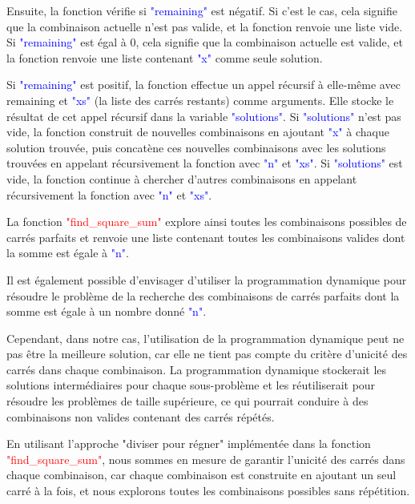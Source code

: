 \documentclass{article}
\begin{document}
Ensuite, la fonction vérifie si \textcolor{blue}{"remaining"} est négatif. Si c'est le cas, cela signifie que la combinaison actuelle n'est pas valide, et la fonction renvoie une liste vide. Si \textcolor{blue}{"remaining"} est égal à 0, cela signifie que la combinaison actuelle est valide, et la fonction renvoie une liste contenant \textcolor{blue}{"x"} comme seule solution.\newline

Si \textcolor{blue}{"remaining"} est positif, la fonction effectue un appel récursif à elle-même avec remaining et \textcolor{blue}{"xs"} (la liste des carrés restants) comme arguments. Elle stocke le résultat de cet appel récursif dans la variable \textcolor{blue}{"solutions"}. Si \textcolor{blue}{"solutions"} n'est pas vide, la fonction construit de nouvelles combinaisons en ajoutant \textcolor{blue}{"x"} à chaque solution trouvée, puis concatène ces nouvelles combinaisons avec les solutions trouvées en appelant récursivement la fonction avec \textcolor{blue}{"n"} et \textcolor{blue}{"xs"}. Si \textcolor{blue}{"solutions"} est vide, la fonction continue à chercher d'autres combinaisons en appelant récursivement la fonction avec \textcolor{blue}{"n"} et \textcolor{blue}{"xs"}.\newline

La fonction \textcolor{red}{"find\_square\_sum"} explore ainsi toutes les combinaisons possibles de carrés parfaits et renvoie une liste contenant toutes les combinaisons valides dont la somme est égale à \textcolor{blue}{"n"}.\newline

Il est également possible d'envisager d'utiliser la programmation dynamique pour résoudre le problème de la recherche des combinaisons de carrés parfaits dont la somme est égale à un nombre donné \textcolor{blue}{"n"}.\newline

Cependant, dans notre cas, l'utilisation de la programmation dynamique peut ne pas être la meilleure solution, car elle ne tient pas compte du critère d'unicité des carrés dans chaque combinaison. La programmation dynamique stockerait les solutions intermédiaires pour chaque sous-problème et les réutiliserait pour résoudre les problèmes de taille supérieure, ce qui pourrait conduire à des combinaisons non valides contenant des carrés répétés.\newline

En utilisant l'approche "diviser pour régner" implémentée dans la fonction \textcolor{red}{"find\_square\_sum"}, nous sommes en mesure de garantir l'unicité des carrés dans chaque combinaison, car chaque combinaison est construite en ajoutant un seul carré à la fois, et nous explorons toutes les combinaisons possibles sans répétition.\newline
\end{document}
